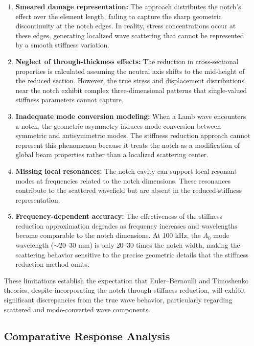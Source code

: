 \documentclass[12pt,a4paper]{report}
\begin{document}
\begin{enumerate}
    \item \textbf{Smeared damage representation:} The approach distributes the notch's effect over the element length, failing to capture the sharp geometric discontinuity at the notch edges. In reality, stress concentrations occur at these edges, generating localized wave scattering that cannot be represented by a smooth stiffness variation.

    \item \textbf{Neglect of through-thickness effects:} The reduction in cross-sectional properties is calculated assuming the neutral axis shifts to the mid-height of the reduced section. However, the true stress and displacement distributions near the notch exhibit complex three-dimensional patterns that single-valued stiffness parameters cannot capture.

    \item \textbf{Inadequate mode conversion modeling:} When a Lamb wave encounters a notch, the geometric asymmetry induces mode conversion between symmetric and antisymmetric modes. The stiffness reduction approach cannot represent this phenomenon because it treats the notch as a modification of global beam properties rather than a localized scattering center.

    \item \textbf{Missing local resonances:} The notch cavity can support local resonant modes at frequencies related to the notch dimensions. These resonances contribute to the scattered wavefield but are absent in the reduced-stiffness representation.

    \item \textbf{Frequency-dependent accuracy:} The effectiveness of the stiffness reduction approximation degrades as frequency increases and wavelengths become comparable to the notch dimensions. At 100 kHz, the $A_0$ mode wavelength ($\sim$20--30 mm) is only 20--30 times the notch width, making the scattering behavior sensitive to the precise geometric details that the stiffness reduction method omits.
\end{enumerate}

These limitations establish the expectation that Euler--Bernoulli and Timoshenko theories, despite incorporating the notch through stiffness reduction, will exhibit significant discrepancies from the true wave behavior, particularly regarding scattered and mode-converted wave components.

\subsection{Comparative Response Analysis}
\end{document}
